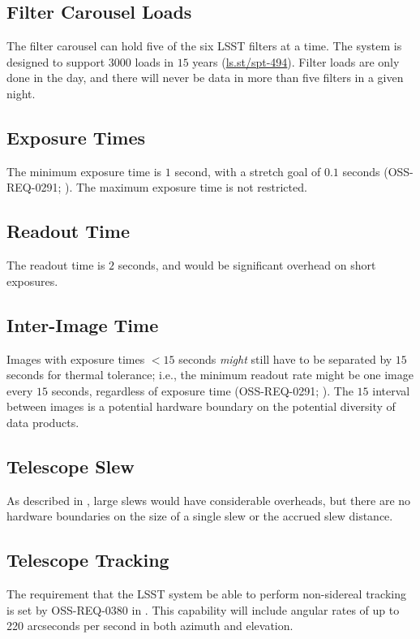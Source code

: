 \documentclass[DM,lsstdoc,toc]{lsstdoc}
\begin{document}
\subsection{Filter Carousel Loads}
The filter carousel can hold five of the six LSST filters at a time.
The system is designed to support $3000$ loads in $15$ years (\url{ls.st/spt-494}).
Filter loads are only done in the day, and there will never be data in more than five filters in a given night.

\subsection{Exposure Times}
The minimum exposure time is $1$ second, with a stretch goal of $0.1$ seconds (OSS-REQ-0291; ).
The maximum exposure time is not restricted.

\subsection{Readout Time}
The readout time is $2$ seconds, and would be significant overhead on short exposures.

\subsection{Inter-Image Time}
Images with exposure times $<15$ seconds {\it might} still have to be separated by $15$ seconds for thermal tolerance; i.e., the minimum readout rate might be one image every $15$ seconds, regardless of exposure time (OSS-REQ-0291; ).
The $15$ interval between images is a potential hardware boundary on the potential diversity of data products.

\subsection{Telescope Slew}
As described in , large slews would have considerable overheads, but there are no hardware boundaries on the size of a single slew or the accrued slew distance.

\subsection{Telescope Tracking}
The requirement that the LSST system be able to perform non-sidereal tracking is set by OSS-REQ-0380 in .
This capability will include angular rates of up to 220 arcseconds per second in both azimuth and elevation. 
\end{document}
